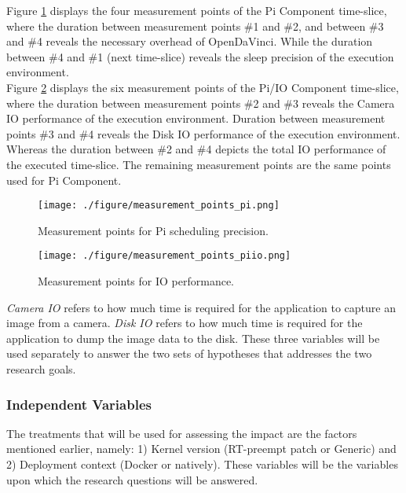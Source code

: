 Figure \ref{pi_measure} displays the four measurement points of the Pi Component time-slice, where the duration between measurement points \#1 and \#2, and between \#3 and \#4 reveals the necessary overhead of OpenDaVinci. While the duration between \#4 and \#1 (next time-slice) reveals the sleep precision of the execution environment.\\

Figure \ref{piio_measure} displays the six measurement points of the Pi/IO Component time-slice, where the duration between measurement points \#2 and \#3 reveals the Camera IO performance of the execution environment. Duration between measurement points \#3 and \#4 reveals the Disk IO performance of the execution environment. Whereas the duration between \#2 and \#4 depicts the total IO performance of the executed time-slice. The remaining measurement points are the same points used for Pi Component.\\


\begin{figure}[ht]
\centering
     \texttt{[image: ./figure/measurement\_points\_pi.png]}
      \caption{Measurement points for Pi scheduling precision.}
       \label{pi_measure}
\end{figure}

\begin{figure}[ht]
\centering
     \texttt{[image: ./figure/measurement\_points\_piio.png]}
      \caption{Measurement points for IO performance.}
       \label{piio_measure}
\end{figure}

 \textit{Camera IO} refers to how much time is required for the application to capture an image from a camera. \textit{Disk IO} refers to how much time is required for the application to dump the image data to the disk. These three variables will be used separately to answer the two sets of hypotheses that addresses the two research goals. 

\subsubsection*{Independent Variables}
The treatments that will be used for assessing the impact are the factors mentioned earlier, namely: 1) Kernel version (RT-preempt patch or Generic) and 2) Deployment context (Docker or natively). These variables will be the variables upon which the research questions will be answered.

